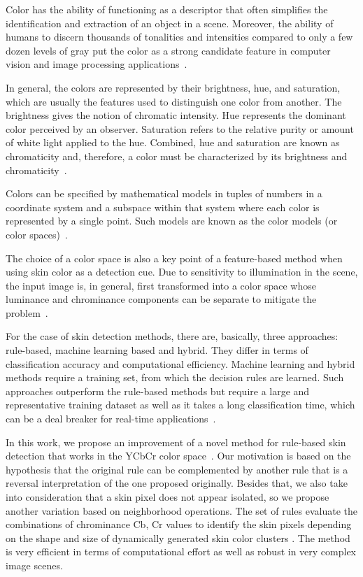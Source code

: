 Color has the ability of functioning as a descriptor that often simplifies the identification and extraction of an object in a scene. Moreover, the ability of humans to discern thousands of tonalities and intensities compared to only a few dozen levels of gray put the color as a strong candidate feature in computer vision and image processing applications~\citep{gonzalez:02}.

In general, the colors are represented by their brightness, hue, and saturation, which are usually the features used to distinguish one color from another. The brightness gives the notion of chromatic intensity. Hue represents the dominant color perceived by an observer. Saturation refers to the relative purity or amount of white light applied to the hue. Combined, hue and saturation are known as chromaticity and, therefore, a color must be characterized by its brightness and chromaticity~\citep{gonzalez:02}.

Colors can be specified by mathematical models in tuples of numbers in a coordinate system and a subspace within that system where each color is represented by a single point. Such models are known as the color models (or color spaces)~\citep{gonzalez:02}.

The choice of a color space is also a key point of a feature-based method when using skin color as a detection cue. Due to sensitivity to illumination in the scene, the input image is, in general, first transformed into a color space whose luminance and chrominance components can be separate to mitigate the problem~\citep{vezhnevets:03}.

For the case of skin detection methods, there are, basically, three approaches: rule-based, machine learning based and hybrid. They differ in terms of classification accuracy and computational efficiency. Machine learning and hybrid methods require a training set, from which the decision rules are learned. Such approaches outperform the rule-based methods but require a large and representative training dataset as well as it takes a long classification time, which can be a deal breaker for real-time applications~\citep{kakumanu:07}.

In this work, we propose an improvement of a novel method for rule-based skin detection that works in the YCbCr color space~\citep{brancati:17}. Our motivation is based on the hypothesis that the original rule can be complemented by another rule that is a reversal interpretation of the one proposed originally. Besides that, we also take into consideration that a skin pixel does not appear isolated, so we propose another variation based on neighborhood operations. The set of rules evaluate the combinations of chrominance Cb, Cr values to identify the skin pixels depending on the shape and size of dynamically generated skin color clusters \citep{brancati:17}. The method is very efficient in terms of computational effort as well as robust in very complex image scenes.



